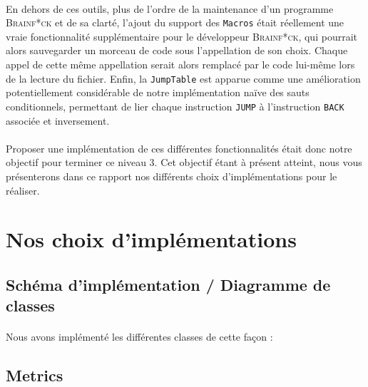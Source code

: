 \documentclass[a4paper]{article}
\begin{document}
\paragraph{}En dehors de ces outils, plus de l'ordre de la maintenance d'un programme \textsc{Brainf*ck} et de sa clarté, l'ajout du support des \texttt{Macros} était réellement une vraie fonctionnalité supplémentaire pour le développeur \textsc{Brainf*ck}, qui pourrait alors sauvegarder un morceau de code sous l'appellation de son choix. Chaque appel de cette même appellation serait alors remplacé par le code lui-même lors de la lecture du fichier. Enfin, la \texttt{JumpTable} est apparue comme une amélioration potentiellement considérable de notre implémentation naïve des sauts conditionnels, permettant de lier chaque instruction \texttt{JUMP} à l'instruction \texttt{BACK} associée et inversement.
\paragraph{}Proposer une implémentation de ces différentes fonctionnalités était donc notre objectif pour terminer ce niveau 3. Cet objectif étant à présent atteint, nous vous présenterons dans ce rapport nos différents choix d'implémentations pour le réaliser.

\section{Nos choix d'implémentations}
\subsection{Schéma d'implémentation / Diagramme de classes}
\paragraph{}Nous avons implémenté les différentes classes de cette façon :
\subsection{Metrics}
\end{document}
